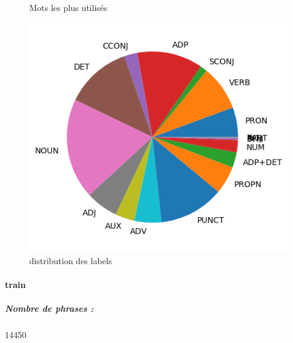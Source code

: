 \begin{figure}[H]
\begin{minipage}{0.48\textwidth}
\begin{tabular}{|l || *{11 }{|c} |}
\end{tabular}
\caption{ Mots les plus utilisés } \label{Fig:muw}\end{minipage} 
\begin{minipage}{0.48\textwidth} \centering
\includegraphics[width=.7\linewidth]{gsdtest_img.png}
\caption{distribution des labels}
\end{minipage}
\end{figure} \paragraph{train } 
\subparagraph{Nombre de phrases :} 14450\\ 

